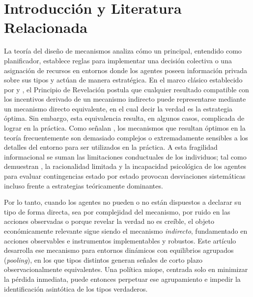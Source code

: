\documentclass[review,authoryear,12pt]{elsarticle}
\theoremstyle{plain}
\theoremstyle{definition}
\newcommand{\1}{\mathbf{1}}
\begin{document}
\section{Introducción y Literatura Relacionada}\label{sec:intro}

La teoría del diseño de mecanismos analiza cómo un principal, entendido como planificador, establece reglas para implementar una decisión colectiva o una asignación de recursos en entornos donde los agentes poseen información privada sobre sus tipos y actúan de manera estratégica. En el marco clásico establecido por \citet{Gibbard1973} y \citet{Myerson1979IC,Myerson1981}, el Principio de Revelación postula que cualquier resultado compatible con los incentivos derivado de un mecanismo indirecto puede representarse mediante un mecanismo directo equivalente, en el cual decir la verdad es la estrategia óptima. Sin embargo, esta equivalencia resulta, en algunos casos, complicada de lograr en la práctica. Como señalan \citet{BergemannMorris2012}, los mecanismos que resultan óptimos en la teoría frecuentemente son demasiado complejos o extremadamente sensibles a los detalles del entorno para ser utilizados en la práctica. A esta fragilidad informacional se suman las limitaciones conductuales de los individuos; tal como demuestran \citet{ZhangLevin2017}, la racionalidad limitada y la incapacidad psicológica de los agentes para evaluar contingencias estado por estado provocan desviaciones sistemáticas incluso frente a estrategias teóricamente dominantes.

Por lo tanto, cuando los agentes no pueden o no están dispuestos a declarar su tipo de forma directa, sea por complejidad del mecanismo, por ruido en las acciones observadas o porque revelar la verdad no es creíble, el objeto económicamente relevante sigue siendo el mecanismo \emph{indirecto}, fundamentado en acciones observables e instrumentos implementables y robustos. Este artículo desarrolla ese mecanismo para entornos dinámicos con equilibrios agrupados (\emph{pooling}), en los que tipos distintos generan señales de corto plazo observacionalmente equivalentes. Una política miope, centrada solo en minimizar la pérdida inmediata, puede entonces perpetuar ese agrupamiento e impedir la identificación asintótica de los tipos verdaderos.
\end{document}
